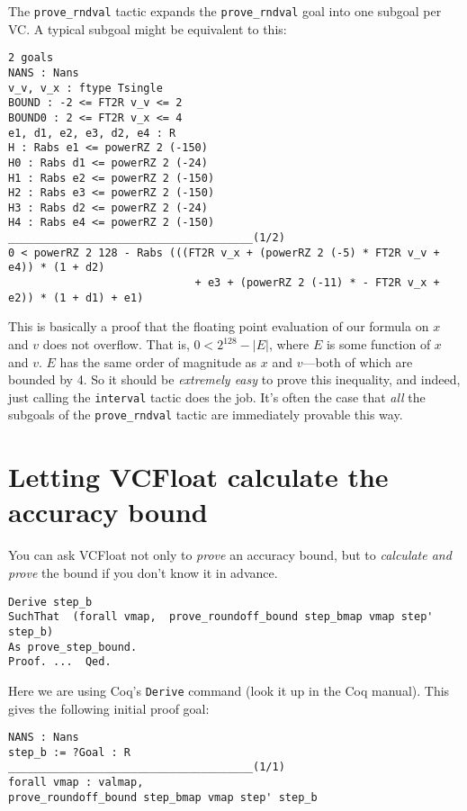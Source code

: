 \documentclass[article]{memoir}
\begin{document}
The \lstinline{prove_rndval} tactic expands
the \lstinline{prove_rndval} goal into one subgoal per VC.
A typical subgoal might be equivalent to this:

\begin{lstlisting}
2 goals
NANS : Nans
v_v, v_x : ftype Tsingle
BOUND : -2 <= FT2R v_v <= 2
BOUND0 : 2 <= FT2R v_x <= 4
e1, d1, e2, e3, d2, e4 : R
H : Rabs e1 <= powerRZ 2 (-150)
H0 : Rabs d1 <= powerRZ 2 (-24)
H1 : Rabs e2 <= powerRZ 2 (-150)
H2 : Rabs e3 <= powerRZ 2 (-150)
H3 : Rabs d2 <= powerRZ 2 (-24)
H4 : Rabs e4 <= powerRZ 2 (-150)
______________________________________(1/2)
0 < powerRZ 2 128 - Rabs (((FT2R v_x + (powerRZ 2 (-5) * FT2R v_v + e4)) * (1 + d2)
                             + e3 + (powerRZ 2 (-11) * - FT2R v_x + e2)) * (1 + d1) + e1)
\end{lstlisting}

This is basically a proof that the floating point evaluation
of our formula on $x$ and $v$ does not
overflow.  That is, $0 < 2^{128}-|E|$, where
$E$ is some function of $x$ and $v$.
$E$ has the same order of magnitude as $x$ and $v$---both of which are bounded
by 4.   So it should be \emph{extremely easy} to prove this
inequality, and indeed, just calling the \lstinline{interval}
tactic does the job.  It's often the case that \emph{all} the
subgoals of the \lstinline{prove_rndval} tactic are
immediately provable this way.

\chapter{Letting VCFloat calculate the accuracy bound}
\label{calculate-bound}

You can ask VCFloat not only to \emph{prove} an accuracy bound,
but to \emph{calculate and prove} the bound if you don't know it
in advance.

\begin{lstlisting}
Derive step_b 
SuchThat  (forall vmap,  prove_roundoff_bound step_bmap vmap step' step_b)
As prove_step_bound.
Proof. ...  Qed.
\end{lstlisting}
Here we are using Coq's \lstinline{Derive} command (look it up in the
Coq manual).  This gives the following initial proof goal:

\begin{lstlisting}
NANS : Nans
step_b := ?Goal : R
______________________________________(1/1)
forall vmap : valmap,
prove_roundoff_bound step_bmap vmap step' step_b
\end{lstlisting}
\end{document}
